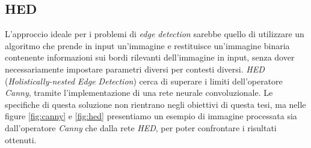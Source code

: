 \subsection{HED}
L'approccio ideale per i problemi di \textit{edge detection} sarebbe quello di utilizzare un algoritmo che prende in input un'immagine e restituisce un'immagine binaria contenente informazioni sui bordi rilevanti dell'immagine in input, senza dover necessariamente impostare parametri diversi per contesti diversi.
\textit{HED} (\textit{Holistically-nested Edge Detection}) \cite{bib:hed} cerca di superare i limiti dell'operatore \textit{Canny}, tramite l'implementazione di una rete neurale convoluzionale. Le specifiche di questa soluzione non rientrano negli obiettivi di questa tesi, ma nelle figure \ref{fig:canny} e \ref{fig:hed} presentiamo un esempio di immagine processata sia dall'operatore \textit{Canny} che dalla rete \textit{HED}, per poter confrontare i risultati ottenuti.

